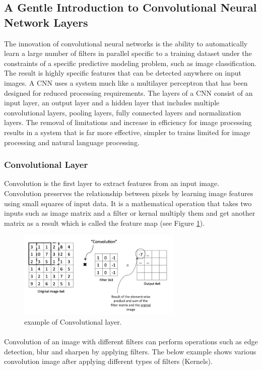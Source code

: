 \subsection{A Gentle Introduction to Convolutional Neural Network Layers }   
The innovation of convolutional neural networks is the ability to automatically learn a large number of filters in parallel specific to a training dataset under the constraints of a specific predictive modeling problem, such as image classification. The result is highly specific features that can be detected anywhere on input images.
\newline
A CNN uses a system much like a multilayer perceptron that has been designed for reduced processing requirements. The layers of a CNN consist of an input layer, an output layer and a hidden layer that includes multiple convolutional layers, pooling layers, fully connected layers and normalization layers. The removal of limitations and increase in efficiency for image processing results in a system that is far more effective, simpler to trains limited for image processing and natural language processing.

\subsubsection{Convolutional Layer}
Convolution is the first layer to extract features from an input image. Convolution preserves the relationship between pixels by learning image features using small squares of input data. It is a mathematical operation that takes two inputs such as image matrix and a filter or kernal multiply them and get another matrix as a result which  is called the feature map (see Figure \ref{conv}).
\begin{figure}[H]
	\centering
	\includegraphics[width=0.7\textwidth]{conv_layer.png}
	\caption{example of Convolutional layer.}
	\label{conv}
\end{figure}
\paragraph{}
Convolution of an image with different filters can perform operations such as edge detection, blur and sharpen by applying filters. The below example shows various convolution image after applying different types of filters (Kernels).
